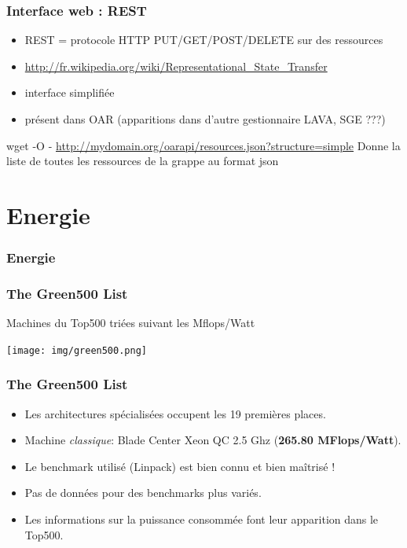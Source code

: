 \documentclass{beamer}
\begin{document}
\begin{frame}
  \frametitle{Interface web : REST} 
  \begin{block}{}
    \begin{itemize}
      \item REST = protocole HTTP PUT/GET/POST/DELETE sur des ressources 
      \item \url{http://fr.wikipedia.org/wiki/Representational_State_Transfer}
      \item interface simplifiée
      \item  présent dans OAR (apparitions dans d'autre gestionnaire LAVA, SGE ???)  
    \end{itemize}
  \end{block}

wget -O -
\url{http://mydomain.org/oarapi/resources.json?structure=simple}
Donne la liste de toutes les ressources de la grappe au format json 

\end{frame}



\section{Energie}

\begin{frame}
  \frametitle{Energie}
\end{frame}


\begin{frame}
  \frametitle{The Green500 List}
    Machines du Top500 triées suivant les Mflops/Watt


    \begin{center}
      \texttt{[image: img/green500.png]}
    \end{center} 

\end{frame}

\begin{frame}
  \frametitle{The Green500 List}
  \begin{itemize}
		\item Les architectures spécialisées occupent les 19 premières places.
    \item Machine {\em classique}: Blade Center Xeon QC 2.5 Ghz ({\bf 265.80 MFlops/Watt}).
    \item Le benchmark utilisé (Linpack) est bien connu et bien maîtrisé !
    \item Pas de données pour des benchmarks plus variés.
    \item Les informations sur la puissance consommée font leur apparition dans le Top500.  
   \end{itemize}
\end{frame}
\end{document}
